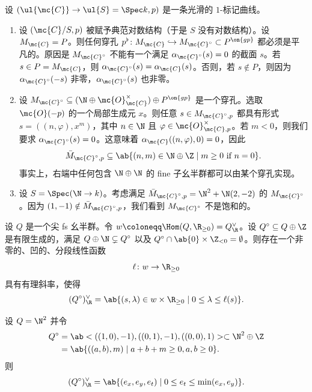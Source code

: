 \begin{exm}
    设 \((\ul{\mc{C}} \to \ul{S} = \Spec k, p)\) 是一条光滑的 \(1\)-标记曲线。
    \begin{enumerate}
        \item 设 \((\mc{C}/S, p)\) 被赋予典范对数结构（于是 \(S\) 没有对数结构）。设 \(M_{\mc{C}} = P\)。则任何穿孔 \(p^{\flat} \colon M_{\mc{C}} \hookrightarrow M_{\mc{C}^{\circ}} \subset P^{\on{gp}}\) 都必须是平凡的。原因是 \(M_{\mc{C}^{\circ}}\) 不能有一个满足 \(\alpha_{\mc{C}^{\circ}}(s) = 0\) 的截面 \(s\)。若 \(s \in P = M_{\mc{C}}\)，则 \(\alpha_{\mc{C}^{\circ}}(s) = \alpha_{\mc{C}}(s)\)。否则，若 \(s \notin P\)，则因为 \(\alpha_{\mc{C}^{\circ}}(-s)\) 非零，\(\alpha_{\mc{C}^{\circ}}(s)\) 也非零。
        \item 设 \(M_{\mc{C}^{\circ}} \subseteq (\N \oplus \mc{O}_{\mc{C}}^{\times}) \oplus P^{\on{gp}}\) 是一个穿孔。选取 \(\mc{O}(-p)\) 的一个局部生成元 \(x\)。则任意 \(s \in M_{\mc{C}^{\circ}, p}\) 都具有形式 \(s = ((n, \varphi), x^m)\)，其中 \(n \in \N\) 且 \(\varphi \in \mc{O}_{\mc{C}, p}^{\times}\)。若 \(m < 0\)，则我们要求 \(\alpha_{\mc{C}^{\circ}}(s) = 0\)。这意味着 \(\alpha_{\mc{C}}((n, \varphi), 0) = 0\)，因此
            \[ \bar{M}_{\mc{C}^{\circ}, p} \subseteq \ab\{(n, m) \in \N \oplus \Z \mid m \geq 0 \text{ if } n = 0 \}. \]
            事实上，右端中任何包含 \(\N \oplus \N\) 的 fine 子幺半群都可以由某个穿孔实现。
        \item 设 \(S = \Spec(\N \to k)\)。考虑满足 \(\bar{M}_{\mc{C}^{\circ}, p} = \N^2 + \N (2,-2)\) 的 \(M_{\mc{C}^{\circ}}\)。因为 \((1,-1) \notin \bar{M}_{\mc{C}^{\circ}, p}\)，我们看到 \(M_{\mc{C}^{\circ}}\) 不是饱和的。
    \end{enumerate}
\end{exm}

\begin{lem}
    设 \(Q\) 是一个尖 fs 幺半群。令 \(w \coloneqq \Hom(Q, \R_{\geq 0}) = Q_{\R}^{\vee}\)。设 \(Q^{\circ} \subseteq Q \oplus \Z\) 是有限生成的，满足 \(Q \oplus \N \subsetneq Q^{\circ}\) 以及 \(Q^{\circ} \cap \ab\{0\} \times \Z_{<0} = \emptyset\)。则存在一个非零的、凹的、分段线性函数
    \[ \ell \colon w \to \R_{\geq 0} \]
    具有有理斜率，使得
    \[ (Q^{\circ})_{\R}^{\vee} = \ab\{ (s, \lambda) \in w \times \R_{\geq 0} \mid 0 \leq \lambda \leq \ell(s) \}. \]
\end{lem}

\begin{exm}
    设 \(Q = \N^2\) 并令
    \begin{align*}
        Q^{\circ} &= \ab<((1,0), -1), ((0,1), -1), ((0,0),1)> \subset \N^2 \oplus \Z \\
        &= \ab\{((a,b), m) \mid a+b+m \geq 0, a,b \geq 0 \}.
    \end{align*}
    则
    \[ (Q^{\circ})_{\R}^{\vee} = \ab\{ (e_x, e_y, e_t) \mid 0 \leq e_t \leq \min(e_x, e_y) \}. \]
\end{exm}





